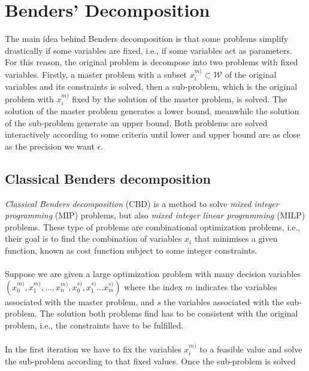 \section{Benders' Decomposition}
The main idea behind Benders decomposition is that some problems simplify drastically if some variables are fixed, i.e., if some variables act as parameters. For this reason, the original problem is decompose into two problems with fixed variables. Firstly, a master problem with a subset $x^{m)}_{i} \subset \mathcal{W}$ of the original variables and its constraints is solved, then a sub-problem, which is the original problem with $x^{m)}_{i}$ fixed by the solution of the master problem, is solved. The solution of the master problem generates a lower bound, meanwhile the solution of the sub-problem generate an upper bound. Both problems are solved interactively according to some criteria until lower and upper bound are as close as the precision we want $\epsilon$.
\subsection{Classical Benders decomposition}
\textit{Classical Benders decomposition} (CBD) is a method to solve \textit{mixed integer programming} (MIP) problems, but also \textit{mixed integer linear programming} (MILP) problems. These type of problems are combinational optimization problems, i.e., their goal is to find the combination of variables $x_{i}$ that minimises a given function, known as cost function subject to some integer constraints.\\\\
Suppose we are given a large optimization problem with many decision variables $\left(x_{0}^{m)}, x_{1}^{m)}, \hdots , x_{n}^{m)}, x_{0}^{s)}, x_{1}^{s)}\hdots x_{m}^{s)}\right)$ where the index $m$ indicates the variables associated with the master problem, and $s$ the variables associated with the sub-problem. The solution both problems find has to be consistent with the original problem, i.e., the constraints have to be fulfilled.\\\\
In the first iteration we have to fix the variables $x_{i}^{m)}$ to a feasible value and solve the sub-problem according to that fixed values. Once the sub-problem is solved



\newcommand{\keyword}[1]{\textbf{#1}}
\newcommand{\tabhead}[1]{\textbf{#1}}
\newcommand{\code}[1]{\texttt{#1}}
\newcommand{\file}[1]{\texttt{\bfseries#1}}
\newcommand{\option}[1]{\texttt{\itshape#1}}




